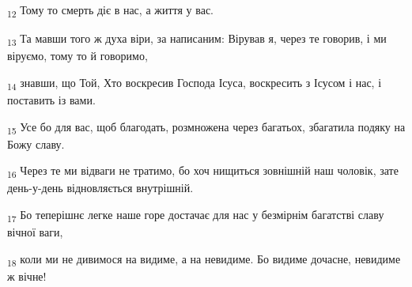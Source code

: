 \begin{tcolorbox}
\textsubscript{12} Тому то смерть діє в нас, а життя у вас.
\end{tcolorbox}
\begin{tcolorbox}
\textsubscript{13} Та мавши того ж духа віри, за написаним: Вірував я, через те говорив, і ми віруємо, тому то й говоримо,
\end{tcolorbox}
\begin{tcolorbox}
\textsubscript{14} знавши, що Той, Хто воскресив Господа Ісуса, воскресить з Ісусом і нас, і поставить із вами.
\end{tcolorbox}
\begin{tcolorbox}
\textsubscript{15} Усе бо для вас, щоб благодать, розмножена через багатьох, збагатила подяку на Божу славу.
\end{tcolorbox}
\begin{tcolorbox}
\textsubscript{16} Через те ми відваги не тратимо, бо хоч нищиться зовнішній наш чоловік, зате день-у-день відновляється внутрішній.
\end{tcolorbox}
\begin{tcolorbox}
\textsubscript{17} Бо теперішнє легке наше горе достачає для нас у безмірнім багатстві славу вічної ваги,
\end{tcolorbox}
\begin{tcolorbox}
\textsubscript{18} коли ми не дивимося на видиме, а на невидиме. Бо видиме дочасне, невидиме ж вічне!
\end{tcolorbox}
